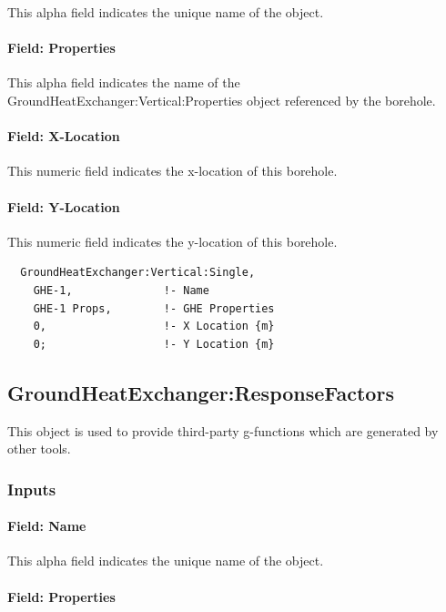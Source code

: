 This alpha field indicates the unique name of the object.

\paragraph{Field: Properties}

This alpha field indicates the name of the GroundHeatExchanger:Vertical:Properties object referenced by the borehole.

\paragraph{Field: X-Location}

This numeric field indicates the x-location of this borehole.

\paragraph{Field: Y-Location}

This numeric field indicates the y-location of this borehole.

\begin{lstlisting}
  GroundHeatExchanger:Vertical:Single,
    GHE-1,              !- Name
    GHE-1 Props,        !- GHE Properties
    0,                  !- X Location {m}
    0;                  !- Y Location {m}
\end{lstlisting}

\subsection{GroundHeatExchanger:ResponseFactors}\label{groundheatexchangerresponsefactors}

This object is used to provide third-party g-functions which are generated by other tools.

\subsubsection{Inputs}

\paragraph{Field: Name}

This alpha field indicates the unique name of the object.

\paragraph{Field: Properties}


